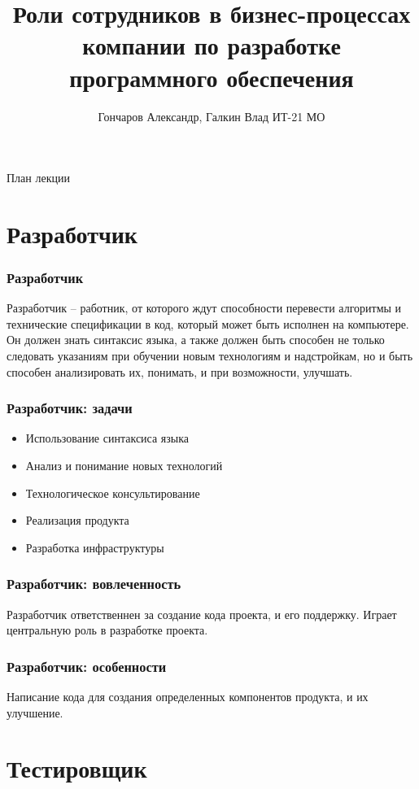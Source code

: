 \documentclass{../industrial-development}
\title{Роли сотрудников в бизнес-процессах компании по разработке программного обеспечения}
\author{Гончаров Александр, Галкин Влад ИТ-21 МО}
\date{}
\begin{document}
	
	\begin{frame}
		\titlepage
	\end{frame}
	
	\begin{frame}{План лекции}
		\tableofcontents
	\end{frame}
	
	
	\section{Разработчик }
	
	\begin{frame} \frametitle{Разработчик}
		\begin{block}{}
			\alert {}Разработчик – работник, от которого ждут способности перевести алгоритмы и технические спецификации в код, который может быть исполнен на компьютере. Он должен знать синтаксис языка, а также должен быть способен не только следовать указаниям при обучении новым технологиям и надстройкам, но и быть способен анализировать их, понимать, и при возможности, улучшать.
			
		\end{block}
		
	\end{frame}
	
	\begin{frame} \frametitle{Разработчик: задачи}
		\begin{itemize}
			\item Использование синтаксиса языка
			\item Анализ и понимание новых технологий
			\item Технологическое консультирование
			\item Реализация продукта
			\item Разработка инфраструктуры
		\end{itemize}
	\end{frame}

	\begin{frame} \frametitle{Разработчик: вовлеченность}
		Разработчик ответственнен за создание кода проекта, и его поддержку. Играет центральную роль в разработке проекта.
	\end{frame}
	
	\begin{frame} \frametitle{Разработчик: особенности}
		Написание кода для создания определенных компонентов продукта, и их улучшение. 	
	\end{frame}

	\section{Тестировщик }
	
\end{document}
